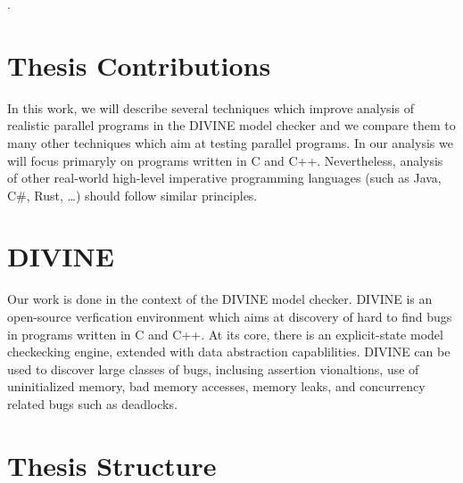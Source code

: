 .

\section{Thesis Contributions}

In this work, we will describe several techniques which improve analysis of realistic parallel programs in the DIVINE model checker and we compare them to many other techniques which aim at testing parallel programs.
In our analysis we will focus primaryly on programs written in C and C++.
Nevertheless, analysis of other real-world high-level imperative programming languages (such as Java, C\#, Rust, …) should follow similar principles.


\section{DIVINE}

Our work is done in the context of the DIVINE model checker.
DIVINE is an open-source verfication environment which aims at discovery of hard to find bugs in programs written in C and C++.
At its core, there is an explicit-state model checkecking engine, extended with data abstraction capablilities.
DIVINE can be used to discover large classes of bugs, inclusing assertion vionaltions, use of uninitialized memory, bad memory accesses, memory leaks, and concurrency related bugs such as deadlocks.

\section{Thesis Structure}
